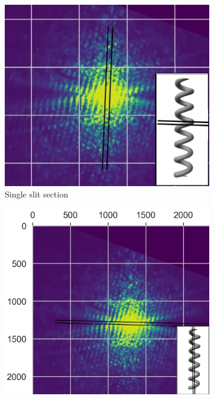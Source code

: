 \begin{figure}[H]
    \centering
    \begin{subfigure}{0.48\columnwidth}
        \centering
        \includegraphics[width=\columnwidth]{figures/HelixSection2.png} %
        \caption{Single slit section}
        \label{fig:HelixSection1}
    \end{subfigure}
    \begin{subfigure}{0.48\columnwidth}
        \centering
        \includegraphics[width=\columnwidth]{figures/HelixSection1.png}

\end{subfigure}
\end{figure}
